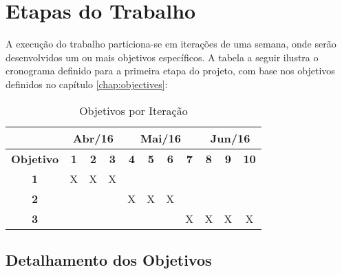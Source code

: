 \chapter{\label{chap:work-plan}Etapas do Trabalho}

A execução do trabalho particiona-se em iterações de uma semana, onde serão
desenvolvidos um ou mais objetivos específicos. A tabela a seguir ilustra o
cronograma definido para a primeira etapa do projeto, com base nos objetivos
definidos no capítulo \ref{chap:objectives}:

\begin{table}[htb!]
\centering
\caption{Objetivos por Iteração}
\label{tab:work-plan}
\begin{tabular}{c|c|c|c|c|c|c|c|c|c|c|}
\cline{2-11}
{\bf}                                 & \multicolumn{3}{c|}{{\bf Abr/16}} & \multicolumn{4}{c|}{{\bf Mai/16}}     & \multicolumn{3}{c|}{{\bf Jun/16}} \\ \hline
\multicolumn{1}{|c|}{{\bf Objetivo}}  & {\bf 1} & {\bf 2} & {\bf 3}       & {\bf 4} & {\bf 5} & {\bf 6} & {\bf 7} & {\bf 8} & {\bf 9} & {\bf 10}      \\ \hline
\multicolumn{1}{|c|}{{\bf 1}}         & X       & X       & X             &         &         &         &         &         &         &               \\ \hline
\multicolumn{1}{|c|}{{\bf 2}}         &         &         &               & X       & X       & X       &         &         &         &               \\ \hline
\multicolumn{1}{|c|}{{\bf 3}}         &         &         &               &         &         &         & X       & X       & X       & X             \\ \hline
\end{tabular}
\end{table}

\section{Detalhamento dos Objetivos}

